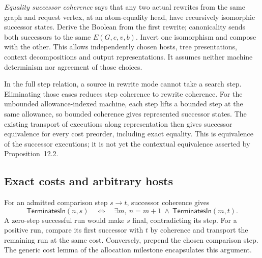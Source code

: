 
\emph{Equality successor coherence} says that any two actual rewrites from
the same graph and request vertex, at an atom-equality head, have recursively
isomorphic successor states. Derive the Boolean from the first rewrite;
canonicality sends both successors to the same $E(G,e,v,b)$. Invert one
isomorphism and compose with the other. This allows independently chosen
hosts, tree presentations, context decompositions and output representations.
It assumes neither machine determinism nor agreement of those choices.


In the full step relation, a source in rewrite mode cannot take a search
step. Eliminating those cases reduces step coherence to rewrite coherence.
For the unbounded allowance-indexed machine, each step lifts a bounded step
at the same allowance, so bounded coherence gives represented successor
states. The existing transport of executions along representation then gives
successor equivalence for every cost preorder, including exact equality.
This is equivalence of the successor executions; it is not yet the contextual
equivalence asserted by Proposition~12.2.




\subsection{Exact costs and arbitrary hosts}

For an admitted comparison step $s\to t$, successor coherence gives
\[
 \mathsf{TerminatesIn}(n,s)
 \quad\Longleftrightarrow\quad
 \exists m,\ n=m+1\ \land\ \mathsf{TerminatesIn}(m,t).
\]
A zero-step successful run would make $s$ final, contradicting its step.
For a positive run, compare its first successor with $t$ by coherence and
transport the remaining run at the same cost. Conversely, prepend the
chosen comparison step. The generic cost lemma of the allocation milestone
encapsulates this argument.

